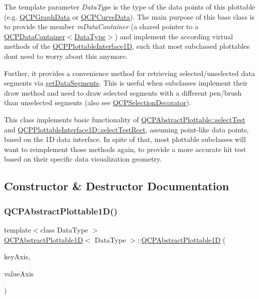 The template parameter {\itshape Data\+Type} is the type of the data points of this plottable (e.\+g. \hyperlink{class_q_c_p_graph_data}{Q\+C\+P\+Graph\+Data} or \hyperlink{class_q_c_p_curve_data}{Q\+C\+P\+Curve\+Data}). The main purpose of this base class is to provide the member {\itshape m\+Data\+Container} (a shared pointer to a \hyperlink{class_q_c_p_data_container}{Q\+C\+P\+Data\+Container$<$Data\+Type$>$}) and implement the according virtual methods of the \hyperlink{class_q_c_p_plottable_interface1_d}{Q\+C\+P\+Plottable\+Interface1D}, such that most subclassed plottables don\textquotesingle{}t need to worry about this anymore.

Further, it provides a convenience method for retrieving selected/unselected data segments via \hyperlink{class_q_c_p_abstract_plottable1_d_ae890e62ce403c54f575c73b9529f1af8}{get\+Data\+Segments}. This is useful when subclasses implement their draw method and need to draw selected segments with a different pen/brush than unselected segments (also see \hyperlink{class_q_c_p_selection_decorator}{Q\+C\+P\+Selection\+Decorator}).

This class implements basic functionality of \hyperlink{class_q_c_p_abstract_plottable_a38efe9641d972992a3d44204bc80ec1d}{Q\+C\+P\+Abstract\+Plottable\+::select\+Test} and \hyperlink{class_q_c_p_plottable_interface1_d_a67093e4ccf490ff5f7750640941ff34c}{Q\+C\+P\+Plottable\+Interface1\+D\+::select\+Test\+Rect}, assuming point-\/like data points, based on the 1D data interface. In spite of that, most plottable subclasses will want to reimplement those methods again, to provide a more accurate hit test based on their specific data visualization geometry. 

\subsection{Constructor \& Destructor Documentation}
\mbox{\label{class_q_c_p_abstract_plottable1_d_a30b2e50ab0afce65f104ea7a95440315}} 
\subsubsection{\texorpdfstring{Q\+C\+P\+Abstract\+Plottable1\+D()}{QCPAbstractPlottable1D()}}
{\footnotesize\ttfamily template$<$class Data\+Type $>$ \\
\hyperlink{class_q_c_p_abstract_plottable1_d}{Q\+C\+P\+Abstract\+Plottable1D}$<$ Data\+Type $>$\+::\hyperlink{class_q_c_p_abstract_plottable1_d}{Q\+C\+P\+Abstract\+Plottable1D} (\begin{DoxyParamCaption}\item[{\hyperlink{class_q_c_p_axis}{Q\+C\+P\+Axis} $\ast$}]{key\+Axis,  }\item[{\hyperlink{class_q_c_p_axis}{Q\+C\+P\+Axis} $\ast$}]{value\+Axis }\end{DoxyParamCaption})}

